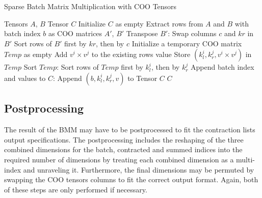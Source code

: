 \begin{algorithm}[H]
    \caption{Sparse Batch Matrix Multiplication with COO Tensors}
    \label{alg:bmm}
    \begin{algorithmic}[1]
        \REQUIRE Tensors $A$, $B$
        \ENSURE Tensor $C$
        \STATE Initialize $C$ as empty
        \STATE Extract rows from $A$ and $B$ with batch index $b$ as COO matrices $A'$, $B'$
        \STATE Transpose $B'$:
        \STATE Swap columns $c$ and $kr$ in $B'$
        \STATE Sort rows of $B'$ first by $kr$, then by $c$
        \STATE Initialize a temporary COO matrix $Temp$ as empty
        \STATE Add $v^i \times v^j$ to the existing rows value
        \ELSE
        \STATE Store $(k_l^i, k_r^j, v^i \times v^j)$ in $Temp$
        \ENDIF
        \ENDFOR
        \ENDFOR
        \STATE Sort $Temp$:
        \STATE Sort rows of $Temp$ first by $k_l^i$, then by $k_r^j$
        \STATE Append batch index and values to $C$:
        \STATE Append $(b, k_l^i, k_r^j, v)$ to Tensor $C$
        \ENDFOR
        \ENDFOR
        \RETURN $C$
    \end{algorithmic}
\end{algorithm}

\subsection{Postprocessing}
The result of the BMM may have to be postprocessed to fit the contraction lists output
specifications. The postprocessing includes the reshaping of the three combined dimensions for
the batch, contracted and summed indices into the required number of dimensions by treating
each combined dimension as a multi-index and unraveling it. Furthermore, the final dimensions
may be permuted by swapping the COO tensors columns to fit the correct output format. Again,
both of these steps are only performed if necessary.

